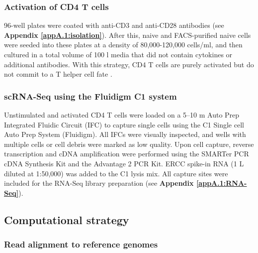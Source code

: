 \newpage

\subsubsection{Activation of CD4\plus{} T cells}

96-well plates were coated with anti-CD3\textepsilon{} and anti-CD28 antibodies (see \textbf{Appendix \ref{appA.1:isolation}}). After this, naive and FACS-purified naive cells were seeded into these plates at a density of 80,000-120,000 cells/ml, and then cultured in a total volume of 100 \textmu{}l media that did not contain cytokines or additional antibodies. With this strategy, CD4\plus{} T cells are purely activated but do not commit to a T helper cell fate \citep{Stubbington2015, Zhu2010}.

\subsubsection{scRNA-Seq using the Fluidigm C1 system}

Unstimulated and activated CD4\plus{} T cells were loaded on a 5–10 \textmu{}m Auto Prep Integrated Fluidic Circuit (IFC) to capture single cells using the C1 Single cell Auto Prep System (Fluidigm). All IFCs were visually inspected, and wells with multiple cells or cell debris were marked as low quality. Upon cell capture, reverse transcription and cDNA amplification were performed using the SMARTer PCR cDNA Synthesis Kit and the Advantage 2 PCR Kit. ERCC spike-in RNA (1 \textmu{}L diluted at 1:50,000) was added to the C1 lysis mix. All capture sites were included for the RNA-Seq library preparation (see \textbf{Appendix \ref{appA.1:RNA-Seq}}).

\subsection{Computational strategy}
\label{sec1:computational}

\subsubsection{Read alignment to reference genomes}

